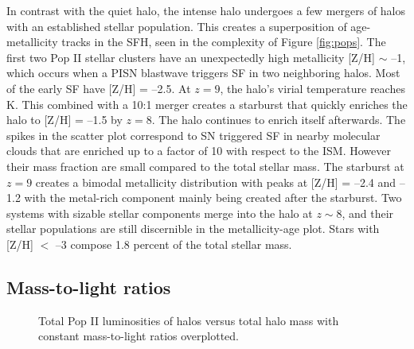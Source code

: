 \documentclass[apjl]{emulateapj}
\begin{document}
In contrast with the quiet halo, the intense halo undergoes a few
mergers of halos with an established stellar population.  This creates
a superposition of age-metallicity tracks in the SFH, seen in the
complexity of Figure \ref{fig:pops}.  The first two Pop II stellar
clusters have an unexpectedly high metallicity [Z/H] $\sim$ --1, which
occurs when a PISN blastwave triggers SF in two neighboring halos.
Most of the early SF have [Z/H] = --2.5.  At $z=9$, the halo's virial
temperature reaches  K.  This combined with a 10:1 merger
creates a starburst that quickly enriches the halo to [Z/H] = --1.5 by
$z=8$.  The halo continues to enrich itself afterwards.  The spikes in
the scatter plot correspond to SN triggered SF in nearby molecular
clouds that are enriched up to a factor of 10 with respect to the ISM.
However their mass fraction are small compared to the total stellar
mass.  The starburst at $z=9$ creates a bimodal metallicity
distribution with peaks at [Z/H] = --2.4 and --1.2 with the metal-rich
component mainly being created after the starburst.  Two systems with
sizable stellar components merge into the halo at $z \sim 8$, and
their stellar populations are still discernible in the metallicity-age
plot.  Stars with [Z/H] $<$ --3 compose 1.8 percent of the total
stellar mass.

\subsection{Mass-to-light ratios}


\begin{figure}
\caption{\label{fig:massfn} Total Pop II luminosities of halos versus
  total halo mass with constant mass-to-light ratios overplotted.}
\end{figure}

\end{document}

